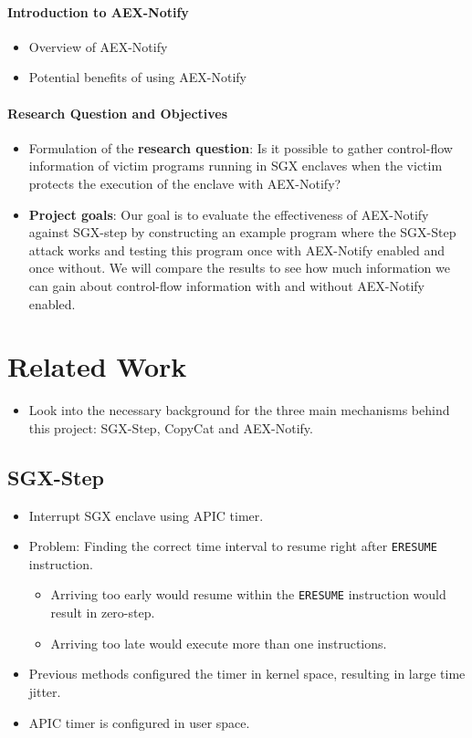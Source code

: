 \documentclass{llncs}
\begin{document}
\paragraph{Introduction to AEX-Notify}
\begin{itemize}
  \item Overview of AEX-Notify
  \item Potential benefits of using AEX-Notify
\end{itemize}

\paragraph{Research Question and Objectives}
\begin{itemize}
  \item Formulation of the \textbf{research question}:
    Is it possible to gather control-flow information of victim programs running
    in SGX enclaves when the victim protects the execution of the enclave with
    AEX-Notify?
  \item \textbf{Project goals}:
    Our goal is to evaluate the effectiveness of AEX-Notify against SGX-step by
    constructing an example program where the SGX-Step attack works and testing
    this program once with AEX-Notify enabled and once without. We will compare
    the results to see how much information we can gain about control-flow
    information with and without AEX-Notify enabled.
\end{itemize}

\section{Related Work}
\begin{itemize}
  \item 
    Look into the necessary background for the three main mechanisms
    behind this project: SGX-Step, CopyCat and AEX-Notify.
\end{itemize}

\subsection{SGX-Step} 
\begin{itemize}
  \item Interrupt SGX enclave using APIC timer.
  \item Problem: Finding the correct time interval to resume right after \texttt{ERESUME} instruction.
    \begin{itemize}
      \item Arriving too early would resume within the \texttt{ERESUME} instruction would result in zero-step.
      \item Arriving too late would execute more than one instructions.
    \end{itemize}
  \item Previous methods configured the timer in kernel space, resulting in large time jitter.
  \item APIC timer is configured in user space.
\end{itemize}
\end{document}
